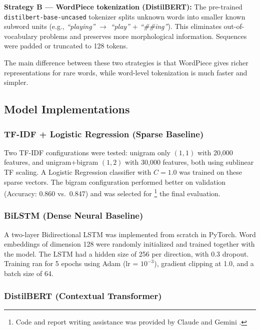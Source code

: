 \documentclass[12pt,a4paper]{article}
\begin{document}
\textbf{Strategy B — WordPiece tokenization (DistilBERT):}
The pre-trained \\ \texttt{distilbert-base-uncased} tokenizer splits unknown words
into smaller known subword units (e.g., \textit{``playing''} $\rightarrow$
\textit{``play''} + \textit{``\#\#ing''}). This eliminates out-of-vocabulary
problems and preserves more morphological information. Sequences were padded or
truncated to 128 tokens.

The main difference between these two strategies is that WordPiece gives richer
representations for rare words, while word-level tokenization is much faster
and simpler.

\subsection{Model Implementations}

\subsubsection{TF-IDF + Logistic Regression (Sparse Baseline)}

Two TF-IDF configurations were tested: unigram only $(1,1)$ with 20{,}000
features, and unigram+bigram $(1,2)$ with 30{,}000 features, both using
sublinear TF scaling. A Logistic Regression classifier with $C{=}1.0$ was
trained on these sparse vectors. The bigram configuration performed better on 
validation (Accuracy: 0.860 vs.\ 0.847) and was selected for \footnote{Code and report writing assistance was provided by
Claude \cite{claude2026} and Gemini \cite{gemini2026}.} the  final evaluation.


\subsubsection{BiLSTM (Dense Neural Baseline)}

A two-layer Bidirectional LSTM was implemented from scratch in PyTorch.
Word embeddings of dimension 128 were randomly initialized and trained together
with the model. The LSTM had a hidden size of 256 per direction, with 0.3
dropout. Training ran for 5 epochs using Adam (lr = $10^{-3}$), gradient
clipping at 1.0, and a batch size of 64.

\subsubsection{DistilBERT (Contextual Transformer)}
\end{document}
